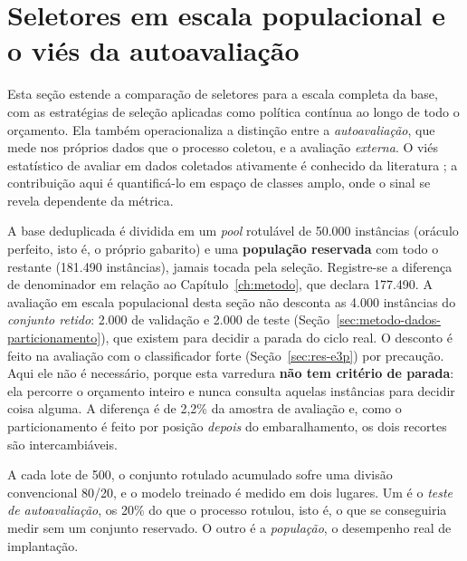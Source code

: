 \section{Seletores em escala populacional e o viés da autoavaliação}
\label{sec:res-e6}

Esta seção estende a comparação de seletores para a escala completa da base,
com as estratégias de seleção aplicadas como política contínua ao longo de todo
o orçamento. Ela também operacionaliza a distinção entre a \emph{autoavaliação},
que mede nos próprios dados que o processo coletou, e a avaliação
\emph{externa}.
O viés estatístico de avaliar em dados coletados ativamente é conhecido da
literatura \citep{Farquhar2021Bias,Kossen2021ActiveTesting}; a contribuição
aqui é quantificá-lo em espaço de classes amplo, onde o sinal se revela
dependente da métrica.

A base deduplicada é dividida em um
\textit{pool} rotulável de 50.000 instâncias (oráculo perfeito, isto é, o
próprio gabarito) e uma \textbf{população reservada} com todo o restante
(181.490 instâncias), jamais tocada pela seleção. Registre-se a diferença de denominador em relação ao
Capítulo~\ref{ch:metodo}, que declara 177.490. A avaliação em escala
populacional desta seção não desconta as 4.000 instâncias do \emph{conjunto
retido}: 2.000 de validação e 2.000 de teste
(Seção~\ref{sec:metodo-dados-particionamento}), que existem para decidir a
parada do ciclo real. O desconto é feito na avaliação com o classificador forte
(Seção~\ref{sec:res-e3p}) por precaução. Aqui ele não é necessário, porque esta
varredura \textbf{não tem critério de parada}: ela percorre o orçamento inteiro
e nunca consulta aquelas instâncias para decidir coisa alguma. A diferença é de 2,2\% da amostra de avaliação e, como o
particionamento é feito por posição \emph{depois} do embaralhamento, os dois
recortes são intercambiáveis.

A cada lote de 500, o conjunto rotulado acumulado sofre uma divisão
convencional 80/20, e o modelo treinado é medido em dois lugares. Um é o
\emph{teste de autoavaliação}, os 20\% do que o processo rotulou, isto é, o que
se conseguiria medir sem um conjunto reservado. O outro é a
\emph{população}, o desempenho real de implantação.

